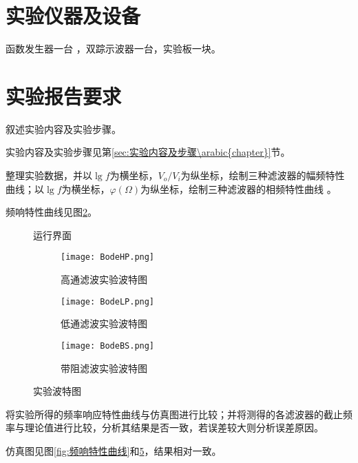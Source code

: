 \section{实验仪器及设备}%
\label{sec:实验仪器及设备\arabic{chapter}}
函数发生器一台 ，双踪示波器一台，实验板一块。
\section{实验报告要求}%
\label{sec:实验报告要求\arabic{chapter}}
\begin{Exercise}
	叙述实验内容及实验步骤。
\end{Exercise}
\begin{Answer}
	实验内容及实验步骤见第\ref{sec:实验内容及步骤\arabic{chapter}}节。
\end{Answer}
\begin{Exercise}
	整理实验数据，并以$ \lg f $为横坐标，$ V_{o}/V_{i} $为纵坐标，绘制三种滤波器的幅频特性曲线；以$ \lg f $为横坐标，$ \varphi(\Omega) $为纵坐标，绘制三种滤波器的相频特性曲线 。
\end{Exercise}
\begin{Answer}
	频响特性曲线见图\ref{fig:高通滤波实验波特图}。
\end{Answer}
\begin{figure}[htpb]
	\centering
	\caption{运行界面}
	\label{fig:运行界面code272.m}
\end{figure}
\begin{figure}[htpb]
	\centering
	\begin{subfigure}[htpb]{.45\linewidth}
		\centering
		\texttt{[image: BodeHP.png]}
		\caption{高通滤波实验波特图}
		\label{fig:高通滤波实验波特图}
	\end{subfigure}
	\quad
	\begin{subfigure}[htpb]{.45\linewidth}
		\centering
		\texttt{[image: BodeLP.png]}
		\caption{低通滤波实验波特图}
		\label{fig:低通滤波实验波特图}
	\end{subfigure}
	\begin{subfigure}[htpb]{.45\linewidth}
		\centering
		\texttt{[image: BodeBS.png]}
		\caption{带阻滤波实验波特图}
		\label{fig:带阻滤波实验波特图}
	\end{subfigure}
	\caption{实验波特图}
	\label{fig:实验波特图}
\end{figure}
\begin{Exercise}
	将实验所得的频率响应特性曲线与仿真图进行比较；并将测得的各滤波器的截止频率与理论值进行比较，分析其结果是否一致，若误差较大则分析误差原因。
\end{Exercise}
\begin{Answer}
	仿真图见图\ref{fig:频响特性曲线}和\ref{fig:实验波特图}，结果相对一致。
\end{Answer}

